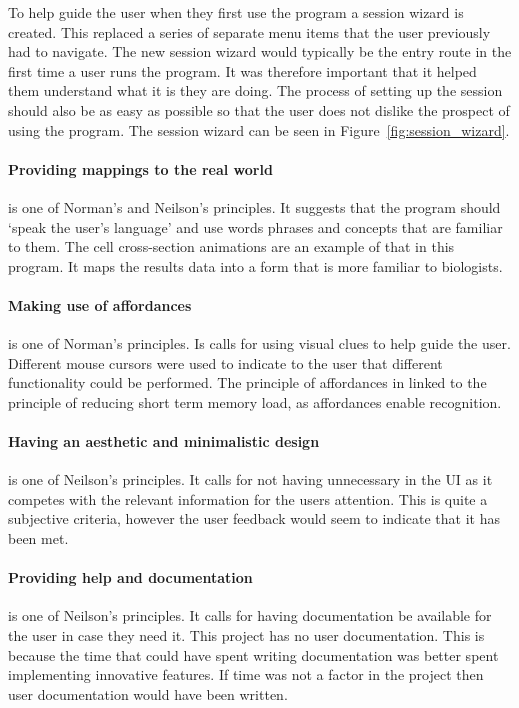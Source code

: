 To help guide the user when they first use the program a session wizard is created.  This replaced a series of separate menu items that the user previously had to navigate. The new session wizard would typically be the entry route in the first time a user runs the program.  It was therefore important that it helped them understand what it is they are doing.  The process of setting up the session should also be as easy as possible so that the user does not dislike the prospect of using the program.  The session wizard can be seen in Figure~\ref{fig:session_wizard}.

\paragraph*{Providing mappings to the real world} is one of Norman's and Neilson's principles.  It suggests that the program should `speak the user's language' and use words phrases and concepts that are familiar to them.  The cell cross-section animations are an example of that in this program.  It maps the results data into a form that is more familiar to biologists.

\paragraph*{Making use of affordances} is one of Norman's principles.  Is calls for using visual clues to help guide the user.  Different mouse cursors were used to indicate to the user that different functionality could be performed.  The principle of affordances in linked to the principle of reducing short term memory load, as affordances enable recognition.

\paragraph*{Having an aesthetic and minimalistic design} is one of Neilson's principles.  It calls for not having unnecessary in the \ac{UI} as it competes with the relevant information for the users attention.  This is quite a subjective criteria, however the user feedback would seem to indicate that it has been met.

\paragraph*{Providing help and documentation} is one of Neilson's principles.  It calls for having documentation be available for the user in case they need it.  This project has no user documentation.  This is because the time that could have spent writing documentation was better spent implementing innovative features.  If time was not a factor in the project then user documentation would have been written.

